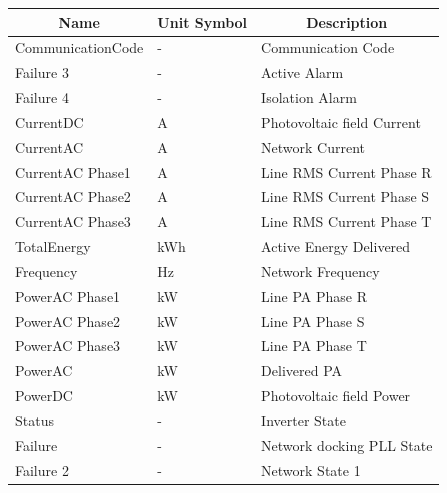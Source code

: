 \begin{table}[H]
	\begin{center}
		\begin{tabular}[c]{l|l|l}
			\hline
			\multicolumn{1}{c|}{\textbf{Name}}        &
			\multicolumn{1}{c|}{\textbf{Unit Symbol}} &
			\multicolumn{1}{c}{\textbf{Description}}                                     \\
			\hline
			CommunicationCode                         & -   & Communication Code         \\
			Failure 3                                 & -   & Active Alarm               \\
			Failure 4                                 & -   & Isolation Alarm            \\
			CurrentDC                                 & A   & Photovoltaic field Current \\
			CurrentAC                                 & A   & Network Current            \\
			CurrentAC Phase1                          & A   & Line RMS Current Phase R   \\
			CurrentAC Phase2                          & A   & Line RMS Current Phase S   \\
			CurrentAC Phase3                          & A   & Line RMS Current Phase T   \\
			TotalEnergy                               & kWh & Active Energy Delivered    \\
			Frequency                                 & Hz  & Network Frequency          \\
			PowerAC Phase1                            & kW  & Line PA Phase R            \\
			PowerAC Phase2                            & kW  & Line PA Phase S            \\
			PowerAC Phase3                            & kW  & Line PA Phase T            \\
			PowerAC                                   & kW  & Delivered PA               \\
			PowerDC                                   & kW  & Photovoltaic field Power   \\
			Status                                    & -   & Inverter State             \\
			Failure                                   & -   & Network docking PLL State  \\
			Failure 2                                 & -   & Network State 1            \\

\end{tabular}
\end{center}
\end{table}
